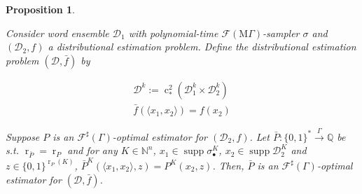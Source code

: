 \documentclass[11pt]{article}
\numberwithin{equation}{section}
\theoremstyle{definition}
\theoremstyle{plain}
\newtheorem{proposition}{Proposition}[section]
\newcommand{\Bool}{\{0,1\}}
\newcommand{\Words}{{\Bool^*}}
\DeclareMathOperator{\Supp}{supp}
\DeclareMathOperator{\R}{r}
\DeclareMathOperator{\En}{c}
\newcommand{\Nats}{\mathbb{N}}
\newcommand{\Rats}{\mathbb{Q}}
\newcommand{\Chev}[1]{\langle #1 \rangle}
\newcommand{\Dist}{\mathcal{D}}
\newcommand{\MGrow}{\mathrm{M}\Gamma}
\newcommand{\Fall}{\mathcal{F}}
\newcommand{\ESG}{\Fall^\sharp(\Gamma)}
\newcommand{\EMG}{\Fall(\MGrow)}
\newcommand{\Scheme}{\xrightarrow{\Gamma}}
\begin{document}
\begin{samepage}
\begin{proposition}
\label{prp:thm__mult__op}

Consider word ensemble $\Dist_1$  with polynomial-time $\EMG$-sampler $\sigma$ and $(\Dist_2,f)$ a distributional estimation problem. Define the distributional estimation problem $(\Dist,\bar{f})$ by 

\begin{align*}
\Dist^k:=\En_*^2(\Dist_1^k \times \Dist_2^k)\\
\bar{f}(\Chev{x_1,x_2})=f(x_2)
\end{align*}

Suppose $P$ is an $\ESG$-optimal estimator for $(\Dist_2,f)$. Let ${\bar{P}: \Words \Scheme \Rats}$ be s.t. $\R_{\bar{P}}=\R_P$ and for any $K \in \Nats^n$, $x_1 \in \Supp \sigma_\bullet^K$, $x_2 \in \Supp \Dist_2^K$ and $z \in \Bool^{\R_P(K)}$, $\bar{P}^K(\Chev{x_1,x_2},z)=P^K(x_2,z)$. Then, $\bar{P}$ is an $\ESG$-optimal estimator for $(\Dist,\bar{f})$.

\end{proposition}
\end{samepage}
\end{document}
